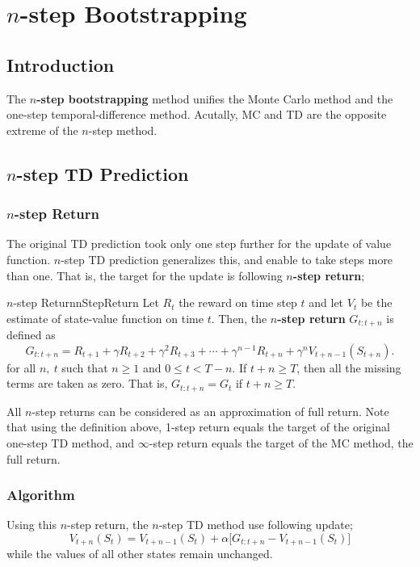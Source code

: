 \documentclass[../../main.tex]{subfiles}
\begin{document}
\chapter{$n$-step Bootstrapping}

\section{Introduction}
    The \textbf{$n$-step bootstrapping} method unifies the Monte Carlo method and the one-step temporal-difference
    method. Acutally, MC and TD are the opposite extreme of the $n$-step method.

\section{$n$-step TD Prediction}
    \subsection{$n$-step Return}
        The original TD prediction took only one step further for the update of value function. $n$-step TD prediction
        generalizes this, and enable to take steps more than one. That is, the target for the update is following
        \textbf{$n$-step return};
        \begin{defn}{$n$-step Return}{nStepReturn}
            Let $R_t$ the reward on time step $t$ and let $V_t$ be the estimate of state-value function on time $t$.
            Then, the \textbf{$n$-step return} $G_{t:t+n}$ is defined as
            \begin{equation}
                G_{t:t+n} = R_{t+1} + \gamma R_{t+2} + \gamma^2 R_{t+3} + \cdots + \gamma^{n-1}R_{t+n} + \gamma^nV_{t+n-1}(S_{t+n}).
            \end{equation}
            for all $n,\ t$ such that $n \geq 1$ and $0 \leq t < T-n$. If $t + n \geq T$, then all the missing terms are taken as zero.
            That is, $G_{t:t+n} = G_t$ if $t+n\geq T$.
        \end{defn}
        All $n$-step returns can be considered as an approximation of full return.
        Note that using the definition above, 1-step return equals the target of the original one-step TD method, and $\infty$-step return
        equals the target of the MC method, the full return.
    
    \subsection{Algorithm}
        Using this $n$-step return, the $n$-step TD method use following update;
        \begin{equation}
            V_{t+n}(S_t) = V_{t+n-1}(S_t) + \alpha \Big[ G_{t:t+n} - V_{t+n-1}(S_t) \Big] \label{eq:nStepTD}
        \end{equation}
        while the values of all other states remain unchanged.
\end{document}
